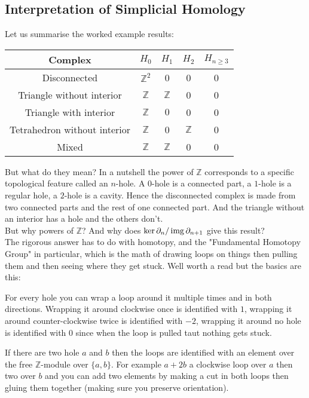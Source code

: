 \subsection{Interpretation of Simplicial Homology}
Let us summarise the worked example results:
\begin{center}
\begin{tabular}{|c|cccc|}
	\hline
	Complex & $H_0$ & $H_1$ & $H_2$ & $H_{n\geq 3}$ \\ 
	\hline
	Disconnected& $\mathbb{Z}^2$ &0&0&0 \\
	Triangle without interior& $\mathbb{Z}$ & $\mathbb{Z}$ & 0 & 0 \\
	Triangle with interior& $\mathbb{Z}$ & $0$ & 0 & 0 \\
	\hline
	\hline
	Tetrahedron without interior&$\mathbb{Z}$&0&$\mathbb{Z}$&0\\
	Mixed&$\mathbb{Z}$&$\mathbb{Z}$&0&0\\
	\hline
\end{tabular}
\end{center}
But what do they mean?
In a nutshell the power of $\mathbb{Z}$ corresponds to a specific topological feature called an $n$-hole.
A $0$-hole is a connected part,
a $1$-hole is a regular hole,
a $2$-hole is a cavity.
Hence the disconnected complex is made from two connected parts and the rest of one connected part.
And the triangle without an interior has a hole and the others don't.
\\

But why powers of  $\mathbb{Z}$?
And why does $\ker\partial_n / \operatorname{img}\partial_{n+1}$ give this result?
\\

The rigorous answer has to do with homotopy,
and the "Fundamental Homotopy Group" in particular,
which is the math of drawing loops on things then pulling them and then seeing where they get stuck.
Well worth a read but the basics are this:

For every hole you can wrap a loop around it multiple times and in both directions.
Wrapping it around clockwise once is identified with $1$,
wrapping it around counter-clockwise twice is identified with $-2$,
wrapping it around no hole is identified with $0$ since when the loop is pulled taut nothing gets stuck.

If there are two hole $a$ and $b$ then the loops are identified with an element over the free $\mathbb{Z}$-module over $\{a,b\}$.
For example $a+2b$ a clockwise loop over $a$ then two over $b$ and you can add two elements by making a cut in both loops then gluing them together (making sure you preserve orientation).

